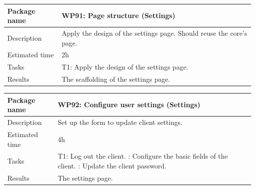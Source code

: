 \documentclass[a4paper, 12pt, oneside]{book}
\begin{document}
\vspace*{16pt}
\begin{tabularx}{\textwidth}{| l | X |}
	\hline
	\rowcolor{rowColor}
	{\semibf Package name}   & {\semibf WP91}: Page structure (Settings)                            \\
	\hline
	{\semibf Description}    & Apply the design of the settings page. Should reuse the core's page. \\
	\hline
	\rowcolor{rowColor}
	{\semibf Estimated time} & 2h                                                                   \\
	\hline
	{\semibf Tasks}          & {\semibf T1}: Apply the design of the settings page.                 \\
	\hline
	\rowcolor{rowColor}
	{\semibf Results}        & The scaffolding of the settings page.                                \\
	\hline
\end{tabularx}
\vspace*{16pt}
\begin{tabularx}{\textwidth}{| l | X |}
	\hline
	\rowcolor{rowColor}
	{\semibf Package name}   & {\semibf WP92}: Configure user settings (Settings) \\
	\hline
	{\semibf Description}    & Set up the form to update client settings.         \\
	\hline
	\rowcolor{rowColor}
	{\semibf Estimated time} & 4h                                                 \\
	\hline
	{\semibf Tasks}          & {\semibf T1}: Log out the client.
	\newline {\semibf T2}: Configure the basic fields of the client.
	\newline {\semibf T3}: Update the client password.                            \\
	\hline
	\rowcolor{rowColor}
	{\semibf Results}        & The settings page.                                 \\
	\hline
\end{tabularx}
\end{document}
